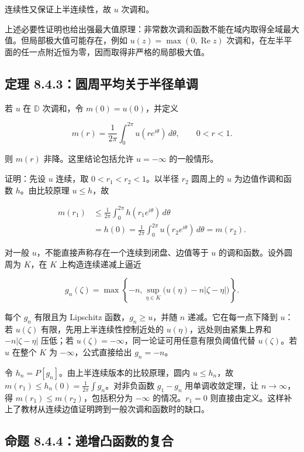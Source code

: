 \documentclass[11pt,a4paper]{article}
\begin{document}
连续性又保证上半连续性，故 \(u\) 次调和。

上述必要性证明也给出强最大值原理：非常数次调和函数不能在域内取得全域最大值。但局部极大值可能存在，例如
\(u(z)=\max(0,\operatorname{Re}z)\)
次调和，在左半平面的任一点附近恒为零，因而取得非严格的局部极大值。

\subsection{定理 8.4.3：圆周平均关于半径单调}\label{ch08-s4-heading-4}

若 \(u\) 在 \(\mathbb D\) 次调和，令 \(m(0)=u(0)\)，并定义

\[
m(r)=\frac1{2\pi}\int_0^{2\pi}u(re^{i\theta})\,d\theta,\qquad 0<r<1.
\]

则 \(m(r)\) 非降。这里结论包括允许 \(u=-\infty\) 的一般情形。

证明：先设 \(u\) 连续，取 \(0<r_1<r_2<1\)。以半径 \(r_2\) 圆周上的 \(u\)
为边值作调和函数 \(h\)。由比较原理 \(u\le h\)，故

\[
\begin{aligned}
m(r_1)&\le\frac1{2\pi}\int_0^{2\pi}h(r_1e^{i\theta})\,d\theta\\
&=h(0)=\frac1{2\pi}\int_0^{2\pi}u(r_2e^{i\theta})\,d\theta=m(r_2).
\end{aligned}\tag{8.4.C}
\]

对一般 \(u\)，不能直接声称存在一个连续到闭盘、边值等于 \(u\)
的调和函数。设外圆周为 \(K\)，在 \(K\) 上构造连续递减上逼近

\[
g_n(\zeta)=\max\left\{-n,\sup_{\eta\in K}\bigl(u(\eta)-n|\zeta-\eta|\bigr)\right\}.\tag{8.4.D}
\]

每个 \(g_n\) 有限且为 Lipschitz 函数，\(g_n\ge u\)，并随 \(n\)
递减。它在每一点下降到 \(u\)：若 \(u(\zeta)\)
有限，先用上半连续性控制近处的 \(u(\eta)\)，远处则由紧集上界和
\(-n|\zeta-\eta|\) 压低；若
\(u(\zeta)=-\infty\)，同一论证可用任意有限负阈值代替 \(u(\zeta)\)。若
\(u\) 在整个 \(K\) 为 \(-\infty\)，公式直接给出 \(g_n=-n\)。

令 \(h_n=P[g_n]\)。由上半连续版本的比较原理，圆内 \(u\le h_n\)，故
\(m(r_1)\le h_n(0)=\frac1{2\pi}\int g_n\)。对非负函数 \(g_1-g_n\)
用单调收敛定理，让 \(n\to\infty\)，得 \(m(r_1)\le m(r_2)\)，包括积分为
\(-\infty\) 的情况。\(r_1=0\)
则直接由定义。这样补上了教材从连续边值证明跨到一般次调和函数时的缺口。

\subsection{命题 8.4.4：递增凸函数的复合}\label{ch08-s4-heading-5}
\end{document}

